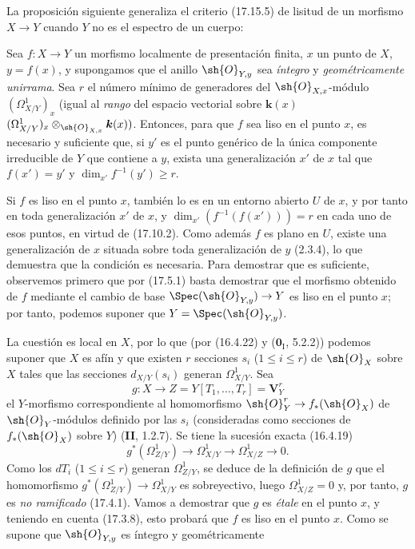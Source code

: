 La proposición siguiente generaliza el criterio (17.15.5) de lisitud de un morfismo $X\to Y$ cuando $Y$ no es el espectro de un cuerpo:

\begin{proposition}[18.10.21]
\label{IV.18.10.21}
Sea $f:X\to Y$ un morfismo localmente de presentación finita, $x$ un punto de $X$, $y=f(x)$, y supongamos que el anillo $\sh{O}_{Y,y}$ sea \emph{íntegro} y \emph{geométricamente unirrama}. Sea $r$ el número mínimo de generadores del $\sh{O}_{X,x}$-módulo $(\Omega^1_{X/Y})_x$ \textup{(igual al \emph{rango} del espacio vectorial sobre $\boldsymbol k(x)$ $(\Omega^1_{X/Y})_x\otimes_{\sh{O}_{X,x}}\boldsymbol k(x))$}. Entonces, para que $f$ sea liso en el punto $x$, es necesario y suficiente que, si $y'$ es el punto genérico de la única componente irreducible de $Y$ que contiene a $y$, exista una generalización $x'$ de $x$ tal que $f(x')=y'$ y $\dim_{x'}f^{-1}(y')\geq r$.
\end{proposition}

Si $f$ es liso en el punto $x$, también lo es en un entorno abierto $U$ de $x$, y por tanto en toda generalización $x'$ de $x$, y $\dim_{x'}(f^{-1}(f(x')))=r$ en cada uno de esos puntos, en virtud de (17.10.2). Como además $f$ es plano en $U$, existe una generalización de $x$ situada sobre toda generalización de $y$ (2.3.4), lo que demuestra que la condición es necesaria. Para demostrar que es suficiente, observemos primero que por (17.5.1) basta demostrar que el morfismo obtenido de $f$ mediante el cambio de base $\Spec(\sh{O}_{Y,y})\to Y$ es liso en el punto $x$; por tanto, podemos suponer que $Y=\Spec(\sh{O}_{Y,y})$.

La cuestión es local en $X$, por lo que (por (16.4.22) y ($\mathbf 0_{\mathrm I}$, 5.2.2)) podemos suponer que $X$ es afín y que existen $r$ secciones $s_i$ ($1\leq i\leq r$) de $\sh{O}_X$ sobre $X$ tales que las secciones $d_{X/Y}(s_i)$ generan $\Omega^1_{X/Y}$. Sea
\[
  g:X\to Z=Y[T_1,\ldots,T_r]=\mathbf V^r_Y
\]
el $Y$-morfismo correspondiente al homomorfismo $\sh{O}_Y^r\to f_*(\sh{O}_X)$ de $\sh{O}_Y$-módulos definido por las $s_i$ (consideradas como secciones de $f_*(\sh{O}_X)$ sobre $Y$) (\textbf{II}, 1.2.7). Se tiene la sucesión exacta (16.4.19)
\[
  g^*(\Omega^1_{Z/Y})\longrightarrow\Omega^1_{X/Y}\longrightarrow\Omega^1_{X/Z}\longrightarrow0.
\]
Como los $dT_i$ ($1\leq i\leq r$) generan $\Omega^1_{Z/Y}$, se deduce de la definición de $g$ que el homomorfismo $g^*(\Omega^1_{Z/Y})\to\Omega^1_{X/Y}$ es sobreyectivo, luego $\Omega^1_{X/Z}=0$ y, por tanto, $g$ es \emph{no ramificado} (17.4.1). Vamos a demostrar que $g$ es \emph{étale} en el punto $x$, y teniendo en cuenta (17.3.8), esto probará que $f$ es liso en el punto $x$. Como se supone que $\sh{O}_{Y,y}$ es íntegro y geométricamente

